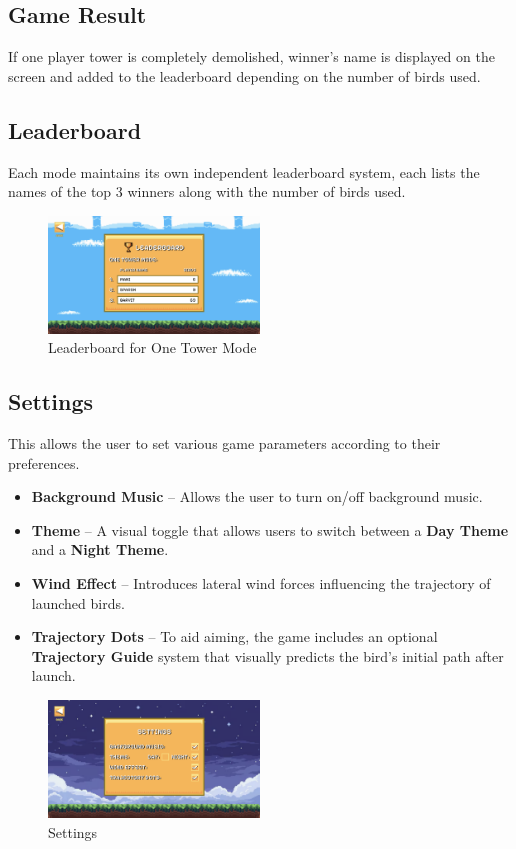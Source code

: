 \documentclass[10pt]{article}
\begin{document}
\subsection{Game Result}
If one player tower is completely demolished, winner's name is displayed on the screen and added to the leaderboard depending on the number of birds used.

\subsection{Leaderboard}
Each mode maintains its own independent leaderboard system, each lists the names of the top 3 winners along with the number of birds used.

\begin{figure}[H]
    \centering
    \includegraphics[width=0.5\textwidth]{leaderboard.png}
    \caption{Leaderboard for One Tower Mode}
\end{figure}

\subsection{Settings}
This allows the user to set various game parameters according to their preferences.
\begin{itemize}
    \item \textbf{Background Music} – Allows the user to turn on/off background music.
    \item \textbf{Theme} – A visual toggle that allows users to switch between a \textbf{Day Theme} and a \textbf{Night Theme}.
    \item \textbf{Wind Effect} – Introduces lateral wind forces influencing the trajectory of launched birds.
    \item \textbf{Trajectory Dots} – To aid aiming, the game includes an optional \textbf{Trajectory Guide} system that visually predicts the bird’s initial path after launch.
\end{itemize}

\begin{figure}[H]
    \centering
    \includegraphics[width=0.5\textwidth]{settings.png}
    \caption{Settings}
\end{figure}
\end{document}
